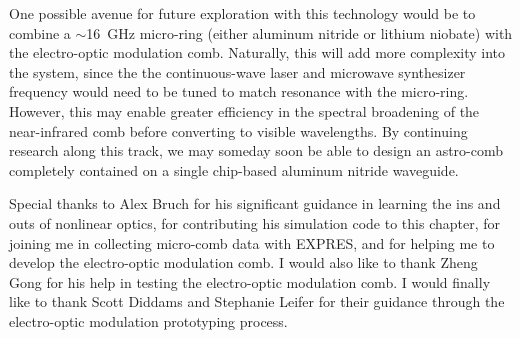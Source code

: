 One possible avenue for future exploration with this technology would be to combine a $\sim$16~\si{\giga\hertz} micro-ring (either aluminum nitride or lithium niobate) with the electro-optic modulation comb. Naturally, this will add more complexity into the system, since the the continuous-wave laser and microwave synthesizer frequency would need to be tuned to match resonance with the micro-ring. However, this may enable greater efficiency in the spectral broadening of the near-infrared comb before converting to visible wavelengths. By continuing research along this track, we may someday soon be able to design an astro-comb completely contained on a single chip-based aluminum nitride waveguide.

Special thanks to Alex Bruch for his significant guidance in learning the ins and outs of nonlinear optics, for contributing his simulation code to this chapter, for joining me in collecting micro-comb data with EXPRES, and for helping me to develop the electro-optic modulation comb. I would also like to thank Zheng Gong for his help in testing the electro-optic modulation comb. I would finally like to thank Scott Diddams and Stephanie Leifer for their guidance through the electro-optic modulation prototyping process.